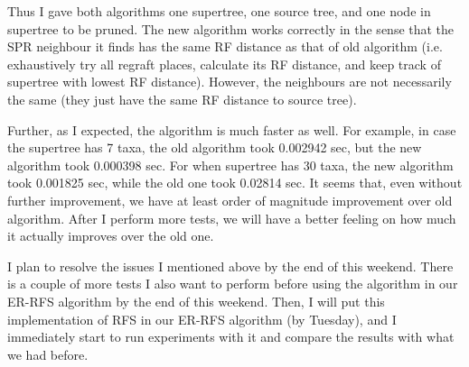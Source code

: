 \documentclass[12pt]{article}
\begin{document}
Thus I gave both algorithms one supertree, one source tree, and one node in supertree to be pruned. The new algorithm works correctly in the sense that the SPR neighbour it finds has the same RF distance as that of old algorithm (i.e. exhaustively try all regraft places, calculate its RF distance, and keep track of supertree with lowest RF distance). However, the neighbours are not necessarily the same (they just have the same RF distance to source tree).

Further, as I expected, the algorithm is much faster as well. For example, in case the supertree has 7 taxa, the old algorithm took 0.002942 sec, but the new algorithm took 0.000398 sec. For when supertree has 30 taxa, the new algorithm took 0.001825 sec, while the old one took 0.02814 sec. It seems that, even without further improvement, we have at least order of magnitude improvement over old algorithm. After I perform more tests, we will have a better feeling on how much it actually improves over the old one. 

I plan to resolve the issues I mentioned above by the end of this weekend. There is a couple of more tests I also want to perform before using the algorithm in our ER-RFS algorithm by the end of this weekend. Then, I will put this implementation of RFS in our ER-RFS algorithm (by Tuesday), and I immediately start to run experiments with it and compare the results with what we had before. 




\end{document}
